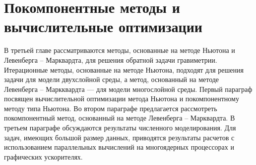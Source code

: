 \chapter{Покомпонентные методы и вычислительные оптимизации}

В третьей главе рассматриваются методы, основанные на методе Ньютона и Левенберга -- Марквардта, для решения обратной задачи гравиметрии. Итерационные методы, основанные на методе Ньютона, подходят для решения задачи для модели двухслойной среды, а метод, основанный на методе Левенберга -- Маркквардта --- для модели многослойной среды. Первый параграф посвящен вычислительной оптимизации метода Ньютона и покомпонентному методу типа Ньютона. Во втором параграфе предлагается рассмотреть покомпонентный метод, основанный на методе Левенберга -- Марквардта. В третьем параграфе обсуждаются результаты численного моделирования. Для задач, имеющих большой размер данных, приводятся результаты расчетов с использованием параллельных вычислений на многоядерных процессорах и графических ускорителях.

